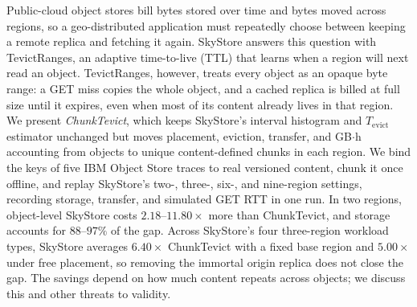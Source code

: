 Public-cloud object stores bill bytes stored over time and bytes moved across regions, so a geo-distributed application must repeatedly choose between keeping a remote replica and fetching it again.
SkyStore answers this question with TevictRanges, an adaptive time-to-live ({TTL}) that learns when a region will next read an object.
TevictRanges, however, treats every object as an opaque byte range: a {GET} miss copies the whole object, and a cached replica is billed at full size until it expires, even when most of its content already lives in that region.
We present \emph{ChunkTevict}, which keeps SkyStore's interval histogram and $T_{\mathrm{evict}}$ estimator unchanged but moves placement, eviction, transfer, and {GB}$\cdot$h accounting from objects to unique content-defined chunks in each region.
We bind the keys of five {IBM} Object Store traces to real versioned content, chunk it once offline, and replay SkyStore's two-, three-, six-, and nine-region settings, recording storage, transfer, and simulated {GET} {RTT} in one run.
In two regions, object-level SkyStore costs $2.18$--$11.80\times$ more than ChunkTevict, and storage accounts for $88$--$97\%$ of the gap.
Across SkyStore's four three-region workload types, SkyStore averages $6.40\times$ ChunkTevict with a fixed base region and $5.00\times$ under free placement, so removing the immortal origin replica does not close the gap.
The savings depend on how much content repeats across objects; we discuss this and other threats to validity.
